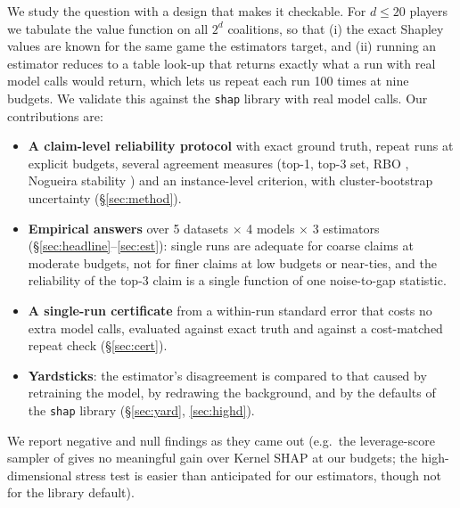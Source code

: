 \documentclass{article}
\begin{document}
We study the question with a design that makes it checkable. For $d\le20$ players we tabulate the value function on all $2^d$ coalitions, so that (i) the exact Shapley values are known for the same game the estimators target, and (ii) running an estimator reduces to a table look-up that returns exactly what a run with real model calls would return, which lets us repeat each run 100 times at nine budgets. We validate this against the \texttt{shap} library with real model calls. Our contributions are:
\begin{itemize}\setlength\itemsep{0pt}
\item \textbf{A claim-level reliability protocol} with exact ground truth, repeat runs at explicit budgets, several agreement measures (top-1, top-3 set, RBO \citep{webber2010}, Nogueira stability \citep{nogueira2018}) and an instance-level criterion, with cluster-bootstrap uncertainty (\S\ref{sec:method}).
\item \textbf{Empirical answers} over 5 datasets $\times$ 4 models $\times$ 3 estimators (\S\ref{sec:headline}--\ref{sec:est}): single runs are adequate for coarse claims at moderate budgets, not for finer claims at low budgets or near-ties, and the reliability of the top-3 claim is a single function of one noise-to-gap statistic.
\item \textbf{A single-run certificate} from a within-run standard error that costs no extra model calls, evaluated against exact truth and against a cost-matched repeat check (\S\ref{sec:cert}).
\item \textbf{Yardsticks}: the estimator's disagreement is compared to that caused by retraining the model, by redrawing the background, and by the defaults of the \texttt{shap} library (\S\ref{sec:yard}, \ref{sec:highd}).
\end{itemize}
We report negative and null findings as they came out (e.g.\ the leverage-score sampler of \citet{musco2024} gives no meaningful gain over Kernel SHAP at our budgets; the high-dimensional stress test is easier than anticipated for our estimators, though not for the library default).
\end{document}

